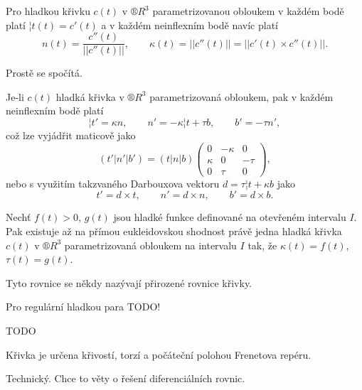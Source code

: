 \documentclass[12pt]{article}					%
\begin{document}
	\begin{lemma}
		Pro hladkou křivku $c(t)$ v $®R^3$ parametrizovanou obloukem v každém bodě platí $¦t(t) = c'(t)$ a v každém neinflexním bodě navíc platí
		$$ n(t) = \frac{c''(t)}{||c''(t)||}, \qquad \kappa(t) = ||c''(t)|| = ||c'(t) \times c''(t)||. $$

		\begin{dukazin}
			Prostě se spočítá.
		\end{dukazin}
	\end{lemma}

	\begin{veta}
		Je-li $c(t)$ hladká křivka v $®R^3$ parametrizovaná obloukem, pak v každém neinflexním bodě platí
		$$ ¦t' = \kappa n, \qquad n' = -\kappa ¦t + \tau b, \qquad b' = -\tau n', $$
		což lze vyjádřit maticově jako
		$$ (t'|n'|b') = (t|n|b)\begin{pmatrix} 0 & -\kappa & 0 \\ \kappa & 0 & -\tau \\ 0 & \tau & 0 \end{pmatrix}, $$
		nebo s využitím takzvaného Darbouxova vektoru $d = \tau¦t + \kappa b$ jako
		$$ t' = d\times t, \qquad n' = d \times n, \qquad b' = d\times b. $$
	\end{veta}

	\begin{veta}
		Nechť $f(t) > 0$, $g(t)$ jsou hladké funkce definované na otevřeném intervalu $I$. Pak existuje až na přímou eukleidovskou shodnost právě jedna hladká křivka $c(t)$ v $®R^3$ parametrizovaná obloukem na intervalu $I$ tak, že $\kappa(t) = f(t)$, $\tau(t) = g(t)$.

		Tyto rovnice se někdy nazývají přirozené rovnice křivky.
	\end{veta}

	\begin{veta}
		Pro regulární hladkou para TODO!
	\end{veta}


	TODO

	\begin{veta}
		Křivka je určena křivostí, torzí a počáteční polohou Frenetova repéru.

		\begin{dukazin}
			Technický. Chce to věty o řešení diferenciálních rovnic.
		\end{dukazin}
	\end{veta}
\end{document}
